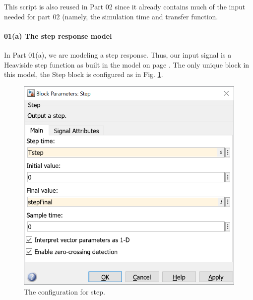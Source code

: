 \documentclass[12pt]{article}
\begin{document}
This script is also reused in Part 02 since it already contains much of the input needed for part 02 (namely, the simulation time and transfer function.

\paragraph{01(a) The step response model}

In Part 01(a), we are modeling a step response. Thus, our input signal is a Heaviside step function as built in
the model on page \pageref{pdf:part01a}.
The only unique block in this model, the Step block is configured as in Fig. \ref{fig:step response model parameters}.




\begin{figure}[h]
    \centering
    \includegraphics[width=(5in/689)*689]{part01a_step_parameters.png}
    \caption{The configuration for step.}
    \label{fig:step response model parameters}
\end{figure}
\end{document}
